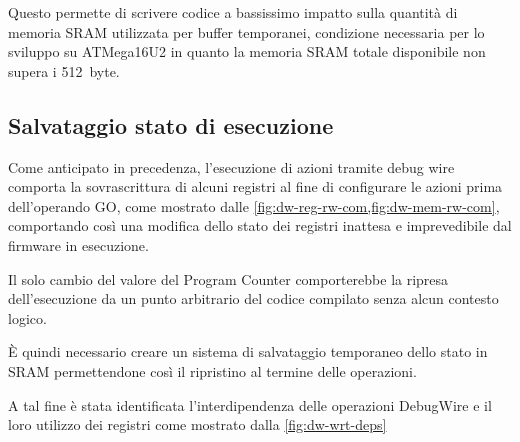 Questo permette di scrivere codice a bassissimo impatto sulla quantità di memoria SRAM utilizzata per buffer temporanei, condizione necessaria per lo sviluppo su ATMega16U2 in quanto la memoria SRAM totale disponibile non supera i \SI{512}{byte}\cite{avr:m16u2}.

\subsection{Salvataggio stato di esecuzione}

Come anticipato in precedenza, l'esecuzione di azioni tramite debug wire comporta la sovrascrittura di alcuni registri al fine di configurare le azioni prima dell'operando GO, come mostrato dalle \cref{fig:dw-reg-rw-com,fig:dw-mem-rw-com}, comportando così una modifica dello stato dei registri inattesa e imprevedibile dal firmware in esecuzione.

Il solo cambio del valore del Program Counter comporterebbe la ripresa dell'esecuzione da un punto arbitrario del codice compilato senza alcun contesto logico.

È quindi necessario creare un sistema di salvataggio temporaneo dello stato in SRAM permettendone così il ripristino al termine delle operazioni.

A tal fine è stata identificata l'interdipendenza delle operazioni DebugWire e il loro utilizzo dei registri come mostrato dalla \cref{fig:dw-wrt-deps}

